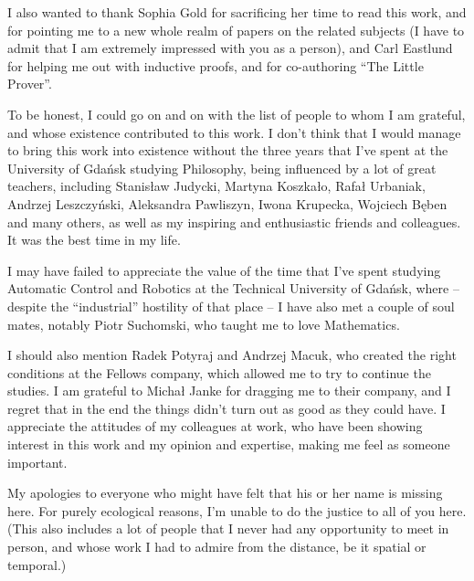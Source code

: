 I also wanted to thank Sophia Gold for sacrificing
her time to read this work, and for pointing me to a new whole realm
of papers on the related subjects (I have to admit that I am extremely
impressed with you as a person), and Carl Eastlund for helping me out
with inductive proofs, and for co-authoring ``The Little Prover''.

To be honest, I could go on and on with the list of people to whom
I am grateful, and whose existence contributed to this work. I don't
think that I would manage to bring this work into existence without
the three years that I've spent at the University of Gdańsk studying
Philosophy, being influenced by a lot of great teachers, including
Stanisław Judycki, Martyna Koszkało, Rafał Urbaniak, Andrzej Leszczyński,
Aleksandra Pawliszyn, Iwona Krupecka, Wojciech Bęben and many others,
as well as my inspiring and enthusiastic friends and colleagues.
It was the best time in my life.

I may have failed to appreciate the value of the time that I've spent
studying Automatic Control and Robotics at the Technical University
of Gdańsk, where -- despite the ``industrial'' hostility of that place
-- I have also met a couple of soul mates, notably Piotr Suchomski,
who taught me to love Mathematics.

I should also mention Radek Potyraj and Andrzej Macuk, who created
the right conditions at the Fellows company, which allowed me to try
to continue the studies. I am grateful to Michał Janke for dragging
me to their company, and I regret that in the end the things didn't
turn out as good as they could have. I appreciate the attitudes of
my colleagues at work, who have been showing interest in this work
and my opinion and expertise, making me feel as someone important.

My apologies to everyone who might have felt that his or her name
is missing here. For purely ecological reasons, I'm unable to do
the justice to all of you here. (This also includes a lot of people
that I never had any opportunity to meet in person, and whose work
I had to admire from the distance, be it spatial or temporal.)



